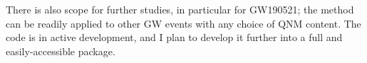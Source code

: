 \documentclass[
12pt, %
english, %
doublespacing, %
headsepline, %
]{MastersDoctoralThesis} %
\begin{document}
There is also scope for further studies, in particular for GW190521; the method can be readily applied to other GW events with any choice of QNM content. 
The code is in active development, and I plan to develop it further into a full and easily-accessible package.





%
%
%


\singlespacing
\printbibliography

\end{document}
